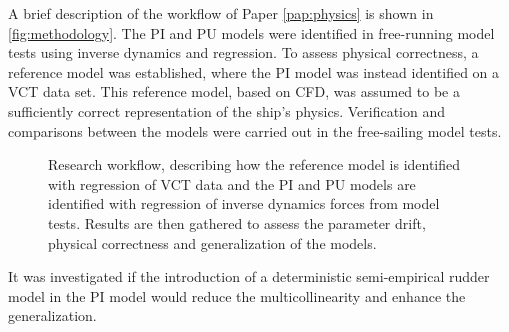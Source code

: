 A brief description of the workflow of Paper \ref{pap:physics} is shown in \autoref{fig:methodology}.
The PI and PU models were identified in free-running model tests using inverse dynamics and regression. To assess physical correctness, a reference model was established, where the PI model was instead identified on a VCT data set. This reference model, based on CFD, was assumed to be a sufficiently correct representation of the ship's physics.
Verification and comparisons between the models were carried out in the free-sailing model tests.
\begin{figure}[h]
  \centering
  
  \caption{Research workflow, describing how the reference model is identified with regression of VCT data and the PI and PU models are identified with regression of inverse dynamics forces from model tests. Results are then gathered to assess the parameter drift, physical correctness and generalization of the models.}
  \label{fig:methodology}
\end{figure}
It was investigated if the introduction of a deterministic semi-empirical rudder model in the PI model would reduce the multicollinearity and enhance the generalization.

\FloatBarrier
